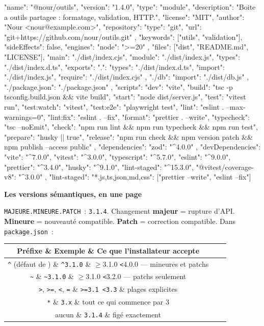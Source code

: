 \documentclass[12pt,a4paper,twoside,openright]{book}
\makeatletter
\providecommand{\cmd}[1]{}%
\renewcommand{\cmd}[1]{\srcbox{\texttt{\detokenize{#1}}}}
\newcommand{\etape}[1]{\par\medskip\noindent\textbf{\large #1}\par\smallskip}
\newenvironment{tabz}[1]{\rowcolors{2}{white}{tralight}%
  \small\setlength{\tabcolsep}{5pt}\setlength{\LTpre}{3pt}\setlength{\LTpost}{3pt}%
  \begin{longtable}{@{}#1@{}}\toprule}
  {\bottomrule\end{longtable}\normalfont\setlength{\tabcolsep}{6pt}}
\newcommand{\thd}[1]{\textbf{\color{white}#1}}
\newcommand{\headrow}{\rowcolor{theadbg}}
\makeatother
\begin{document}
\begin{codejson}
{
  "name": "@nour/outils",
  "version": "1.4.0",
  "type": "module",
  "description": "Boite a outils partagee : formatage, validation, HTTP.",
  "license": "MIT",
  "author": "Nour <nour@example.com>",
  "repository": { "type": "git", "url": "git+https://github.com/nour/outils.git" },
  "keywords": ["utils", "validation"],
  "sideEffects": false,
  "engines": { "node": ">=20" },
  "files": ["dist", "README.md", "LICENSE"],
  "main": "./dist/index.cjs",
  "module": "./dist/index.js",
  "types": "./dist/index.d.ts",
  "exports": {
    ".": { "types": "./dist/index.d.ts", "import": "./dist/index.js", "require": "./dist/index.cjs" },
    "./db": { "import": "./dist/db.js" },
    "./package.json": "./package.json"
  },
  "scripts": {
    "dev": "vite",
    "build": "tsc -p tsconfig.build.json && vite build",
    "start": "node dist/server.js",
    "test": "vitest run",
    "test:watch": "vitest",
    "test:e2e": "playwright test",
    "lint": "eslint . --max-warnings=0",
    "lint:fix": "eslint . --fix",
    "format": "prettier . --write",
    "typecheck": "tsc --noEmit",
    "check": "npm run lint && npm run typecheck && npm run test",
    "prepare": "husky || true",
    "release": "npm run check && npm version patch && npm publish --access public"
  },
  "dependencies": { "zod": "^4.0.0" },
  "devDependencies": {
    "vite": "^7.0.0", "vitest": "^3.0.0", "typescript": "^5.7.0",
    "eslint": "^9.0.0", "prettier": "^3.4.0", "husky": "^9.1.0",
    "lint-staged": "^15.3.0", "@vitest/coverage-v8": "^3.0.0"
  },
  "lint-staged": { "*.{js,ts,json,md,css}": ["prettier --write", "eslint --fix"] }
}
\end{codejson}

\etape{Les versions s\'emantiques, en une page}
\verb|MAJEURE.MINEURE.PATCH|~: \verb|3.1.4|. Changement \textbf{majeur} = rupture d'API.
\textbf{Mineure} = nouveaut\'e compatible. \textbf{Patch} = correction compatible.
Dans \texttt{package.json}~:

\begin{tabz}{clX}
  \headrow \thd{Pr\'efixe} \& \thd{Exemple} \& \thd{Ce que l'installateur accepte} \\
  \midrule
  \verb|^| (d\'efaut de \cmd{npm i}) \& \verb|^3.1.0| \& $\geq$3.1.0 \verb|<|4.0.0 --- mineures et patchs \\
  \verb|~| \& \verb|~3.1.0| \& $\geq$3.1.0 \verb|<|3.2.0 --- patchs seulement \\
  \verb|>|, \verb|>=|, \verb|<|, \verb|=| \& \verb|>=3.1 <3.3| \& plages explicites \\
  \verb|*| \& \verb|3.x| \& tout ce qui commence par 3 \\
  aucun \& \verb|3.1.4| \& fig\'e exactement \\
\end{tabz}
\end{document}
